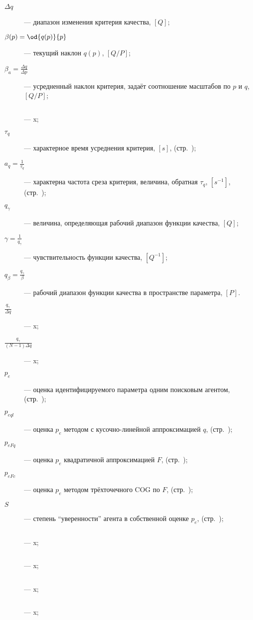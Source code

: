 \begin{description}
  \item[$\Delta q$]  --- диапазон изменения критерия качества, $[Q]$;

  \item[$\beta(p) = \od{q(p)}{p}$]  --- текущий наклон $q(p)$, $[Q/P]$;

  \item[$\beta_a = \frac{\Delta q}{\Delta p} $]  --- усредненный наклон критерия, задаёт соотношение масштабов по $p$ и $q$, $[Q/P]$;

  \item[$ $]  --- x;

  \item[$\tau_q$]  --- характерное время усреднения критерия, $[s]$, (стр.~\pageref{atu:d:tau_q});

  \item[$a_q = \frac{1}{\tau_q} $]  --- характерна частота среза критерия, величина, обратная $\tau_q$, $[s^{-1}]$, (стр.~\pageref{atu:d:a_q});

  \item[$q_\gamma $]  --- величина, определяющая рабочий диапазон функции качества, $[Q]$;

  \item[$\gamma = \frac{1}{q_\gamma} $]  --- чувствительность функции качества, $[Q^{-1}]$;

  \item[$q_\beta = \frac{q_\gamma}{\beta} $]  --- рабочий диапазон функции качества в пространстве параметра, $[P]$.

  \item[$\frac{q_\gamma}{\Delta q} $]  --- x;

  \item[$\frac{q_\gamma}{(N-1)\Delta q} $]  --- x;

  \item[$p_{e} $]  --- оценка идентифицируемого параметра одним поисковым агентом, (стр.~\pageref{atu:d:p_e});

  \item[$p_{eql} $]  --- оценка $p_e$ методом с кусочно-линейной аппроксимацией $q$, (стр.~\pageref{atu:d:p_eql});

  \item[$p_{eFq} $]  --- оценка $p_e$ квадратичной аппроксимацией $F$, (стр.~\pageref{atu:eq:p_eFq});

  \item[$p_{eFc} $]  --- оценка $p_e$ методом трёхточечного COG по $F$, (стр.~\pageref{atu:eq:p_eFc});

  \item[$S$]  --- степень ``уверенности'' агента в собственной оценке $p_e$, (стр.~\pageref{atu:d:S});

  \item[$ $]  --- x;

  \item[$ $]  --- x;

  \item[$ $]  --- x;

  \item[$ $]  --- x;


\end{description}



